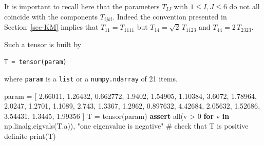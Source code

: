 \documentclass[
  letterpaper,
  DIV=11,
  numbers=noendperiod]{scrreprt}
\newenvironment{Shaded}{\begin{snugshade}}{\end{snugshade}}
\newcommand{\BuiltInTok}[1]{\textcolor[rgb]{0.00,0.23,0.31}{#1}}
\newcommand{\CommentTok}[1]{\textcolor[rgb]{0.37,0.37,0.37}{#1}}
\newcommand{\ControlFlowTok}[1]{\textcolor[rgb]{0.00,0.23,0.31}{\textbf{#1}}}
\newcommand{\DecValTok}[1]{\textcolor[rgb]{0.68,0.00,0.00}{#1}}
\newcommand{\FloatTok}[1]{\textcolor[rgb]{0.68,0.00,0.00}{#1}}
\newcommand{\KeywordTok}[1]{\textcolor[rgb]{0.00,0.23,0.31}{\textbf{#1}}}
\newcommand{\NormalTok}[1]{\textcolor[rgb]{0.00,0.23,0.31}{#1}}
\newcommand{\OperatorTok}[1]{\textcolor[rgb]{0.37,0.37,0.37}{#1}}
\newcommand{\StringTok}[1]{\textcolor[rgb]{0.13,0.47,0.30}{#1}}
\begin{document}
\begin{tcolorbox}[enhanced jigsaw, left=2mm, bottomrule=.15mm, colbacktitle=quarto-callout-warning-color!10!white, colback=white, colframe=quarto-callout-warning-color-frame, rightrule=.15mm, bottomtitle=1mm, toptitle=1mm, titlerule=0mm, title=\textcolor{quarto-callout-warning-color}{\faExclamationTriangle}\hspace{0.5em}{Warning}, toprule=.15mm, arc=.35mm, opacityback=0, opacitybacktitle=0.6, leftrule=.75mm, breakable, coltitle=black]

It is important to recall here that the parameters \(T_{IJ}\) with
\(1\leq I,J\leq 6\) do not all coincide with the components
\(T_{ijkl}\). Indeed the convention presented in Section~\ref{sec-KM}
implies that \(T_{11}=T_{1111}\) but \(T_{14}=\sqrt{2}\,T_{1123}\) and
\(T_{44}=2\,T_{2323}\).

\end{tcolorbox}

Such a tensor is built by

\texttt{T\ =\ tensor(param)}

where \texttt{param} is a \texttt{list} or a \texttt{numpy.ndarray} of
21 items.

\begin{Shaded}
\begin{Highlighting}[]
\NormalTok{param }\OperatorTok{=}\NormalTok{ [ }\FloatTok{2.66011}\NormalTok{, }\FloatTok{1.26432}\NormalTok{, }\FloatTok{0.662772}\NormalTok{, }\FloatTok{1.9402}\NormalTok{, }\FloatTok{1.54905}\NormalTok{, }\FloatTok{1.10384}\NormalTok{, }\FloatTok{3.6072}\NormalTok{, }\FloatTok{1.78964}\NormalTok{, }\FloatTok{2.0247}\NormalTok{, }\FloatTok{1.2701}\NormalTok{, }\FloatTok{1.1089}\NormalTok{, }\FloatTok{2.743}\NormalTok{, }\FloatTok{1.3367}\NormalTok{, }\FloatTok{1.2962}\NormalTok{, }\FloatTok{0.897632}\NormalTok{, }\FloatTok{4.42684}\NormalTok{, }\FloatTok{2.05632}\NormalTok{, }\FloatTok{1.52686}\NormalTok{, }\FloatTok{3.54431}\NormalTok{, }\FloatTok{1.3445}\NormalTok{, }\FloatTok{1.99356}\NormalTok{ ]}
\NormalTok{T }\OperatorTok{=}\NormalTok{ tensor(param)}
\ControlFlowTok{assert} \BuiltInTok{all}\NormalTok{(v }\OperatorTok{\textgreater{}} \DecValTok{0} \ControlFlowTok{for}\NormalTok{ v }\KeywordTok{in}\NormalTok{ np.linalg.eigvals(T.a)), }\StringTok{"one eigenvalue is negative"} \CommentTok{\# check that T is positive definite}
\BuiltInTok{print}\NormalTok{(T)}
\end{Highlighting}
\end{Shaded}
\end{document}
